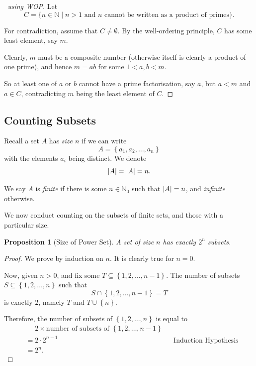 \documentclass{article}
\newtheorem{proposition}[theorem]{Proposition}
\theoremstyle{definition}
\theoremstyle{remark}
\DeclarePairedDelimiter{\abs}{\lvert}{\rvert}
\newcommand{\Bqty}[1]{\left\{#1\right\}}
\newcommand{\set}[2]{\{#1\mid #2\}}
\newcommand{\size}[1]{\lvert #1\rvert}
\newcommand{\NN}{\mathbb{N}}
\begin{document}
\begin{proof}[\proofname\ using WOP]
    Let
    \[
        C = \set{n \in \NN}{n > 1 \text{ and } n \text{ cannot be written as a product of primes}}.
    \]

    For contradiction, assume that \(C \neq \emptyset\). By the well-ordering principle, \(C\) has some least element, say \(m\).

    Clearly, \(m\) must be a composite number (otherwise itself is clearly a product of one prime), and hence \(m = ab\) for some \(1 < a, b < m\).

    So at least one of \(a\) or \(b\) cannot have a prime factorisation, say \(a\), but \(a < m\) and \(a \in C\), contradicting \(m\) being the least element of \(C\).
\end{proof}

\subsection{Counting Subsets}
\label{sec:counting-subsets}

Recall a set \(A\) has \emph{size \(n\)} if we can write
\[
    A = \Bqty{a_1, a_2, \ldots, a_n}
\]
with the elements \(a_i\) being distinct. We denote
\[
    \abs{A} = \size{A} = n.
\]

We say \(A\) is \emph{finite} if there is some \(n \in \NN_0\) such that \(\abs{A} = n\), and \emph{infinite} otherwise.

We now conduct counting on the subsets of finite sets, and those with a particular size.

\begin{proposition}[Size of Power Set]
    A set of size \(n\) has exactly \(2^n\) subsets.
\end{proposition}

\begin{proof}
    We prove by induction on \(n\). It is clearly true for \(n = 0\).

    Now, given \(n > 0\), and fix some \(T \subseteq \Bqty{1, 2, \ldots, n - 1}\). The number of subsets \(S \subseteq \Bqty{1, 2, \ldots, n}\) such that
    \[
        S \cap \Bqty{1, 2, \ldots, n - 1} = T
    \]
    is exactly \(2\), namely \(T\) and \(T \cup \Bqty{n}\).
    

    Therefore, the number of subsets of \(\Bqty{1, 2, \ldots, n}\) is equal to
    \begin{align*}
        &\phantom{=} 2 \times \text{number of subsets of } \Bqty{1, 2, \ldots, n - 1}\\
        &= 2 \cdot 2^{n - 1} && \text{Induction Hypothesis} \\
        &= 2^n.
    \end{align*}
\end{proof}
\end{document}

